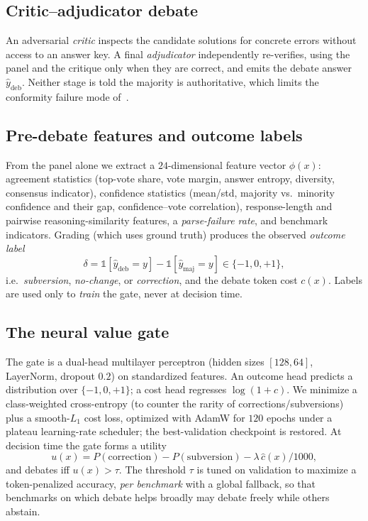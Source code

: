 \documentclass[conference]{IEEEtran}
\begin{document}
\subsection{Critic--adjudicator debate}
An adversarial \emph{critic} inspects the candidate solutions for concrete errors
without access to an answer key. A final \emph{adjudicator} independently
re-verifies, using the panel and the critique only when they are correct, and emits
the debate answer $\hat{y}_\text{deb}$. Neither stage is told the majority is
authoritative, which limits the conformity failure mode of~\cite{wynn2025failure}.

\subsection{Pre-debate features and outcome labels}
From the panel alone we extract a $24$-dimensional feature vector $\phi(x)$:
agreement statistics (top-vote share, vote margin, answer entropy, diversity,
consensus indicator), confidence statistics (mean/std, majority vs.\ minority
confidence and their gap, confidence--vote correlation), response-length and
pairwise reasoning-similarity features, a \emph{parse-failure rate}, and benchmark
indicators. Grading (which uses ground truth) produces the observed \emph{outcome
label}
\[
\delta = \mathbb{1}[\hat{y}_\text{deb}=y] - \mathbb{1}[\hat{y}_\text{maj}=y]\in\{-1,0,+1\},
\]
i.e.\ \emph{subversion}, \emph{no-change}, or \emph{correction}, and the debate token
cost $c(x)$. Labels are used only to \emph{train} the gate, never at decision time.

\subsection{The neural value gate}
The gate is a dual-head multilayer perceptron (hidden sizes $[128,64]$, LayerNorm,
dropout $0.2$) on standardized features. An outcome head predicts a distribution over
$\{-1,0,+1\}$; a cost head regresses $\log(1+c)$. We minimize a class-weighted
cross-entropy (to counter the rarity of corrections/subversions) plus a smooth-$L_1$
cost loss, optimized with AdamW for $120$ epochs under a plateau learning-rate
scheduler; the best-validation checkpoint is restored. At decision time the gate
forms a utility
\[
u(x) = P(\text{correction}) - P(\text{subversion}) - \lambda\,\hat{c}(x)/1000,
\]
and debates iff $u(x) > \tau$. The threshold $\tau$ is tuned on validation to
maximize a token-penalized accuracy, \emph{per benchmark} with a global fallback, so
that benchmarks on which debate helps broadly may debate freely while others abstain.
\end{document}
